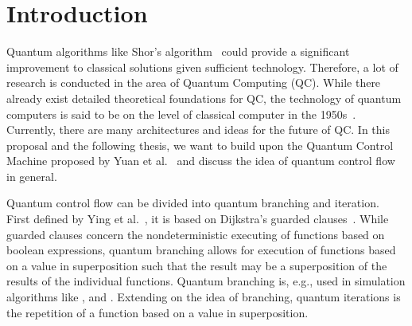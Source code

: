 \chapter{Introduction}

Quantum algorithms like Shor's algorithm~\cite{Shor97} could provide a significant improvement to classical solutions given sufficient technology. Therefore, a lot of research is conducted in the area of Quantum Computing (QC). While there already exist detailed theoretical foundations for QC, the technology of quantum computers is said to be on the level of classical computer in the 1950s~\cite{CFM17}. Currently, there are many architectures and ideas for the future of QC. In this proposal and the following thesis, we want to build upon the Quantum Control Machine proposed by Yuan et al.~\cite{YVC24} and discuss the idea of quantum control flow in general.

Quantum control flow can be divided into quantum branching and iteration.~\cite{YVC24} First defined by Ying et al.~\cite{YYF12}, it is based on Dijkstra's guarded clauses~\cite{Dijk75}. While guarded clauses concern the nondeterministic executing of functions based on boolean expressions, quantum branching allows for execution of functions based on a value in superposition such that the result may be a superposition of the results of the individual functions. Quantum branching is, e.g., used in simulation algorithms like \cite{BGB*18}, and \cite{LoCh19}. Extending on the idea of branching, quantum iterations is the repetition of a function based on a value in superposition. 

